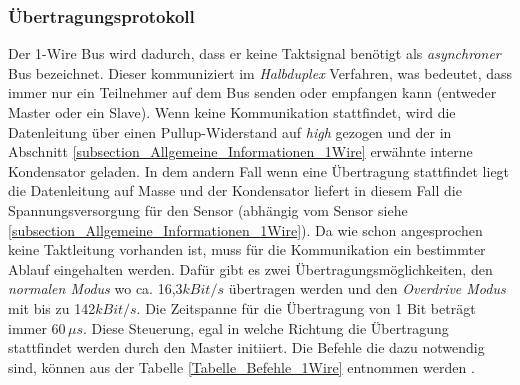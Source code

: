 \subsubsection{Übertragungsprotokoll}
\label{subsection_Protokoll_1Wire}
Der 1-Wire Bus wird dadurch, dass er keine Taktsignal benötigt als \textit{asynchroner} Bus bezeichnet. Dieser kommuniziert im \textit{Halbduplex} Verfahren, was bedeutet, dass immer nur ein Teilnehmer auf dem Bus senden oder empfangen kann (entweder Master oder ein Slave). Wenn keine Kommunikation stattfindet, wird die Datenleitung über einen Pullup-Widerstand auf \textit{high} gezogen und der in Abschnitt \ref{subsection_Allgemeine_Informationen_1Wire} erwähnte interne Kondensator geladen. In dem andern Fall wenn eine Übertragung stattfindet liegt die Datenleitung auf Masse und der Kondensator liefert in diesem Fall die Spannungsversorgung für den Sensor (abhängig vom Sensor siehe \ref{subsection_Allgemeine_Informationen_1Wire}). Da wie schon angesprochen keine Taktleitung vorhanden ist, muss für die Kommunikation ein bestimmter Ablauf eingehalten werden. Dafür gibt es zwei Übertragungsmöglichkeiten, den \textit{normalen Modus} wo ca. 16,3\;$kBit/s$ übertragen werden und den \textit{Overdrive Modus} mit bis zu 142\;$kBit/s$.
Die Zeitspanne für die Übertragung von 1 Bit beträgt immer 60\,$\mu s$. Diese Steuerung, egal in welche Richtung die Übertragung stattfindet werden durch den Master initiiert. Die Befehle die dazu notwendig sind, können aus der Tabelle \ref{Tabelle_Befehle_1Wire} entnommen werden \citep{Bussysteme_in_der_Praxis}.


